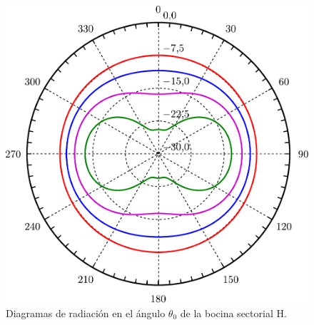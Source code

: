 \begin{figure}[H]
\centering
\includegraphics[scale = 0.5]{Figures/Estudio/estudio_31}
\caption{Diagramas de radiación en el ángulo $\theta_0$ de la bocina sectorial H.}
\label{fig_estudio:31}
\end{figure}
